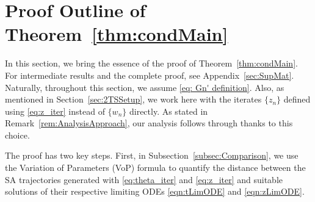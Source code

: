 \documentclass[usenames,dvipsnames,final,12pt]{colt2018} %
\newcommand{\vop}{VoP}
\newcommand{\bart}{\bar{\theta}}
\newcommand{\tSol}[1]{\theta(#1, \tI{n_0}, \theta_{n_0})}
\newcommand{\barz}{\bar{z}}
\newcommand{\zSol}[1]{z(#1, \sI{n_0}, z_{n_0})}
\newcommand{\tI}[1]{t_{#1}}
\newcommand{\sI}[1]{s_{#1}}
\newcommand{\red}[1]{\textcolor{red}{\textsf{#1}}}
\newcommand{\norm}[1]{\left\lVert#1\right\rVert}
\newcommand{\gal}[1]{#1}
\newcommand{\gugan}[1]{#1}
\begin{document}

\section{\gal{Proof Outline of Theorem~\ref{thm:condMain}}}
\label{sec: analysis outline}

\gal{In this section, we bring the essence of the proof of Theorem~\ref{thm:condMain}.} For \gal{intermediate results and the complete proof}, see Appendix~\ref{sec:SupMat}.
\gal{Naturally, t}hroughout \gugan{this} section, we assume \eqref{eq: Gn' definition}. Also, as mentioned in Section~\ref{sec:2TSSetup}, we work \gugan{here} with the iterates $\{z_n\}$ defined using \eqref{eq:z_iter} instead of $\{w_n\}$ directly. As stated in Remark~\ref{rem:AnalysisApproach}, our analysis follows through thanks to this choice.


%
The proof has two key steps. First, in Subsection~\ref{subsec:Comparison}, we use the Variation of Parameters (\vop) formula \citep{lakshmikantham1998method} to quantify the distance
between the \gal{SA} trajectories \gal{generated with \eqref{eq:theta_iter} and \eqref{eq:z_iter} and} suitable solutions of their respective limiting ODEs \eqref{eqn:tLimODE} and \eqref{eqn:zLimODE}.
\end{document}
